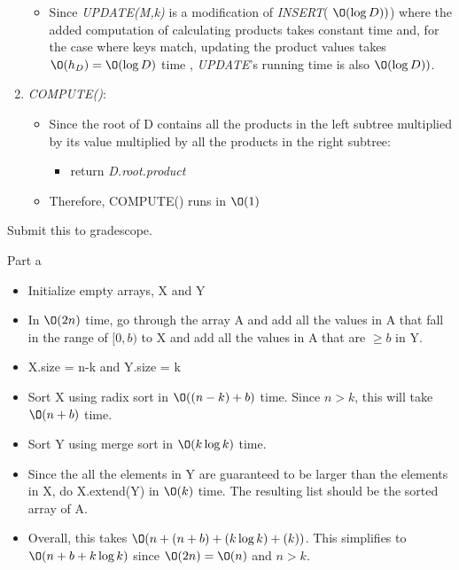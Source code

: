 \documentclass[12pt,twoside]{article}
\begin{document}
\begin{problems}
\begin{enumerate}
\begin{itemize}
\begin{itemize}
	\end{itemize}
	\item Since \textit{UPDATE(M,k)} is a modification of \textit{INSERT}( $\O(\log D)) $) where the added computation of calculating products takes constant time and, for the case where keys match, updating the product values takes $\O(h_D) = \O(\log D) $ time , \textit{UPDATE}'s running time is also $\O(\log D)) $. 
	\end{itemize}
	\item \textit{COMPUTE()}:
	\begin{itemize}
		\item Since the root of D contains all the products in the left subtree multiplied by its value multiplied by all the products in the right subtree:
		\begin{itemize}
			\item  return \textit{D.root.product} 
		\end{itemize}
		\item Therefore, COMPUTE() runs in $\O(1) $
	\end{itemize}
\end{enumerate}  


\problem  Submit this to gradescope. %

\begin{problemparts}
\problempart Part a %
\begin{itemize}
	\item Initialize empty arrays, X and Y
	\item In $\O(2n)$ time, go through the array A and add all the values in A that fall in the range of $[0,b)$ to X and add all the values in A that are $ \geq b $ in Y.
	\item X.size = n-k and Y.size = k
	\item Sort X using radix sort in $\O((n-k)+b)$ time. Since $n>k$, this will take $\O(n+b)$ time. 
	\item Sort Y using merge sort in $\O(k\log k)$ time.
	\item Since the all the elements in Y are guaranteed to be larger than the elements in X, do X.extend(Y) in $\O(k)$ time. The resulting list should be the sorted array of A.
	\item Overall, this takes $\O(n+(n+b)+(k\log k)+(k))$. This simplifies to $\O(n+b+k\log k)$ since $\O(2n) = \O(n)$ and $n>k$.
\end{itemize}

\end{problemparts}


\end{problems}
\end{document}
